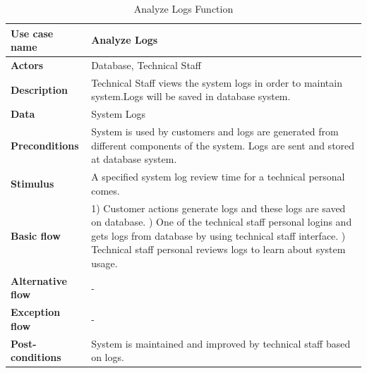  \begin{table}[H]
     \centering
     \begin{tabular}{ | l | p{10cm} |}
     \hline
     \textbf{Use case name}    & Analyze Logs \\
     \hline
     \textbf{Actors}           & Database, Technical Staff \\
     \hline
     \textbf{Description}      & Technical Staff views the system logs in order to maintain system.Logs will be saved in database system. \\
     \hline
     \textbf{Data}             & System Logs \\
     \hline
     \textbf{Preconditions}    & System is used by customers and logs are generated from different components of the system. Logs are sent and stored at database system. \\
     \hline
     \textbf{Stimulus}         & A specified system log review time for a technical personal comes. \\
     \hline
     \textbf{Basic flow}       & 1) Customer actions generate logs and these logs are saved on database. \newline 2) One of the technical staff personal logins and gets logs from database by using technical staff interface.  \newline 3) Technical staff personal reviews logs to learn about system usage. \\
     \hline
     \textbf{Alternative flow} & - \\
     \hline
     \textbf{Exception flow}   & -\\
     \hline
     \textbf{Post-conditions}  & System is maintained and improved by technical staff based on logs. \\
     \hline
     \end{tabular} \caption{Analyze Logs Function}
     \label{tab:09analyze_logs}
 \end{table}

